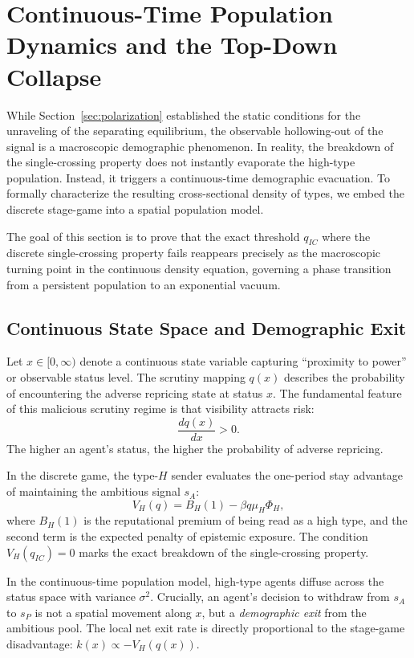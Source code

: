 
\section{Continuous-Time Population Dynamics and the Top-Down Collapse}
\label{sec:continuous-phase-transition}

While Section~\ref{sec:polarization} established the static conditions for the unraveling of the separating equilibrium, the observable hollowing-out of the signal is a macroscopic demographic phenomenon. In reality, the breakdown of the single-crossing property does not instantly evaporate the high-type population. Instead, it triggers a continuous-time demographic evacuation. To formally characterize the resulting cross-sectional density of types, we embed the discrete stage-game into a spatial population model.

The goal of this section is to prove that the exact threshold $q_{IC}$ where the discrete single-crossing property fails reappears precisely as the macroscopic turning point in the continuous density equation, governing a phase transition from a persistent population to an exponential vacuum.

\subsection{Continuous State Space and Demographic Exit}

Let $x \in [0, \infty)$ denote a continuous state variable capturing ``proximity to power'' or observable status level. The scrutiny mapping $q(x)$ describes the probability of encountering the adverse repricing state at status $x$. The fundamental feature of this malicious scrutiny regime is that visibility attracts risk:
\[
\frac{dq(x)}{dx} > 0.
\]
The higher an agent's status, the higher the probability of adverse repricing.

In the discrete game, the type-$H$ sender evaluates the one-period stay advantage of maintaining the ambitious signal $s_A$:
\[
V_H(q) = B_H(1) - \beta q \mu_H \Phi_H,
\]
where $B_H(1)$ is the reputational premium of being read as a high type, and the second term is the expected penalty of epistemic exposure. The condition $V_H(q_{IC}) = 0$ marks the exact breakdown of the single-crossing property. 

In the continuous-time population model, high-type agents diffuse across the status space with variance $\sigma^2$. Crucially, an agent's decision to withdraw from $s_A$ to $s_P$ is not a spatial movement along $x$, but a \emph{demographic exit} from the ambitious pool. The local net exit rate is directly proportional to the stage-game disadvantage: $k(x) \propto -V_H(q(x))$. 

